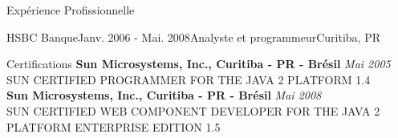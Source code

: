 \documentclass{resume}
\begin{document}
\begin{rSection}{Expérience Profissionnelle}
\begin{rSubsection}{HSBC Banque}{Janv. 2006 - Mai. 2008}{Analyste et programmeur}{Curitiba, PR}
    \end{rSubsection}
  \end{rSection}

  \begin{rSection}{Certifications}
    {\bf Sun Microsystems, Inc., Curitiba - PR - Brésil} \hfill {\em Mai 2005} \\ 
    {SUN CERTIFIED PROGRAMMER FOR THE JAVA 2 PLATFORM 1.4} \\

    {\bf Sun Microsystems, Inc., Curitiba - PR - Brésil} \hfill {\em Mai 2008} \\ 
    {SUN CERTIFIED WEB COMPONENT DEVELOPER FOR THE JAVA 2 PLATFORM ENTERPRISE EDITION 1.5} \\
  \end{rSection}
  
\end{document}
